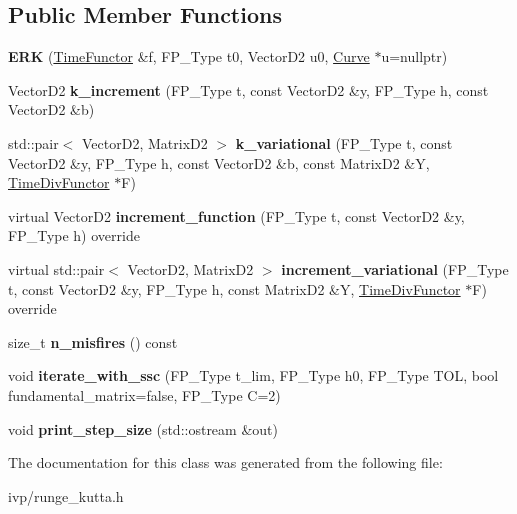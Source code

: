 \subsection*{Public Member Functions}
\begin{DoxyCompactItemize}
\item 
\mbox{\label{classERK_a74d5ab0d29ab4960d9c571553e91fc76}} 
{\bfseries E\+RK} (\hyperlink{classTimeFunctor}{Time\+Functor} \&f, F\+P\+\_\+\+Type t0, Vector\+D2 u0, \hyperlink{classCurve}{Curve} $\ast$u=nullptr)
\item 
\mbox{\label{classERK_ab3dcc059386d02ae76f229dba8909ad3}} 
Vector\+D2 {\bfseries k\+\_\+increment} (F\+P\+\_\+\+Type t, const Vector\+D2 \&y, F\+P\+\_\+\+Type h, const Vector\+D2 \&b)
\item 
\mbox{\label{classERK_a2793e89d81f0fb7142365fa3960d7ba7}} 
std\+::pair$<$ Vector\+D2, Matrix\+D2 $>$ {\bfseries k\+\_\+variational} (F\+P\+\_\+\+Type t, const Vector\+D2 \&y, F\+P\+\_\+\+Type h, const Vector\+D2 \&b, const Matrix\+D2 \&Y, \hyperlink{classTimeDivFunctor}{Time\+Div\+Functor} $\ast$F)
\item 
\mbox{\label{classERK_afdc6a96a8264b23acdeb0d2a31b42f8d}} 
virtual Vector\+D2 {\bfseries increment\+\_\+function} (F\+P\+\_\+\+Type t, const Vector\+D2 \&y, F\+P\+\_\+\+Type h) override
\item 
\mbox{\label{classERK_af2d1cd4fba0eef09a984b1e58e57715c}} 
virtual std\+::pair$<$ Vector\+D2, Matrix\+D2 $>$ {\bfseries increment\+\_\+variational} (F\+P\+\_\+\+Type t, const Vector\+D2 \&y, F\+P\+\_\+\+Type h, const Matrix\+D2 \&Y, \hyperlink{classTimeDivFunctor}{Time\+Div\+Functor} $\ast$F) override
\item 
\mbox{\label{classERK_ae3f71b3f5364ffcab63a715d95adb911}} 
size\+\_\+t {\bfseries n\+\_\+misfires} () const
\item 
\mbox{\label{classERK_a9537f676f3d8df72748a21e3af707474}} 
void {\bfseries iterate\+\_\+with\+\_\+ssc} (F\+P\+\_\+\+Type t\+\_\+lim, F\+P\+\_\+\+Type h0, F\+P\+\_\+\+Type T\+OL, bool fundamental\+\_\+matrix=false, F\+P\+\_\+\+Type C=2)
\item 
\mbox{\label{classERK_a6057b70fbd97bbe2e5b2d0233aef46a4}} 
void {\bfseries print\+\_\+step\+\_\+size} (std\+::ostream \&out)
\end{DoxyCompactItemize}


The documentation for this class was generated from the following file\+:\begin{DoxyCompactItemize}
\item 
ivp/runge\+\_\+kutta.\+h\end{DoxyCompactItemize}
